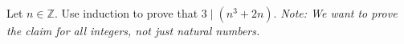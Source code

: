 \documentclass{article}
\newcommand{\Z}{\mathbb{Z}}
\theoremstyle{definition}
\begin{document}
\begin{question}{10}
    Let $n\in \Z$. Use induction to prove that $3 \mid (n^3+2n)$. \textit{Note: We want to prove the claim for all integers, not just natural numbers.}
\end{question}
\begin{solution}
\end{solution}
\end{document}

